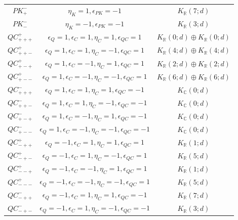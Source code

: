 \documentclass{tADP2e}
\theoremstyle{plain}
\theoremstyle{plain}
\theoremstyle{definition}
\begin{document}
\begin{appendices}
\begin{table}[tbp]
\begin{center}
\begin{tabular}{ccc}
$PK^-_+$ & %
$\eta_K=1,\epsilon_{PK}=-1$ & $K_{\mathbb{R}}(7;d)$ \\
$PK^-_-$ & %
$\eta_K=-1,\epsilon_{PK}=-1$ & $K_{\mathbb{R}}(3;d)$ \\
$QC^+_{+++}$ & $\epsilon_Q=1,\epsilon_C=1,\eta_C=1,\epsilon_{QC}=1$ & $K_{\mathbb{R}}(0;d)\oplus K_{\mathbb{R}}(0;d)$ \\
$QC^+_{++-}$ & $\epsilon_Q=1,\epsilon_C=1,\eta_C=-1,\epsilon_{QC}=1$ & $K_{\mathbb{R}}(4;d)\oplus K_{\mathbb{R}}(4;d)$ \\
$QC^+_{+-+}$ & $\epsilon_Q=1,\epsilon_C=-1,\eta_C=1,\epsilon_{QC}=1$ & $K_{\mathbb{R}}(2;d)\oplus K_{\mathbb{R}}(2;d)$ \\
$QC^+_{+--}$ & $\epsilon_Q=1,\epsilon_C=-1,\eta_C=-1,\epsilon_{QC}=1$ & $K_{\mathbb{R}}(6;d)\oplus K_{\mathbb{R}}(6;d)$ \\
$QC^-_{+++}$ & %
$\epsilon_Q=1,\epsilon_C=1,\eta_C=1,\epsilon_{QC}=-1$ & $K_{\mathbb{C}}(0;d)$ \\
$QC^-_{++-}$ & %
$\epsilon_Q=1,\epsilon_C=1,\eta_C=-1,\epsilon_{QC}=-1$ & $K_{\mathbb{C}}(0;d)$ \\
$QC^-_{+-+}$ & %
$\epsilon_Q=1,\epsilon_C=-1,\eta_C=1,\epsilon_{QC}=-1$ & $K_{\mathbb{C}}(0;d)$ \\
$QC^-_{+--}$ & %
$\epsilon_Q=1,\epsilon_C=-1,\eta_C=-1,\epsilon_{QC}=-1$ & $K_{\mathbb{C}}(0;d)$ \\
$QC^+_{-++}$ & %
$\epsilon_Q=-1,\epsilon_C=1,\eta_C=1,\epsilon_{QC}=1$ & $K_{\mathbb{R}}(1;d)$ \\
$QC^+_{-+-}$ & %
$\epsilon_Q=-1,\epsilon_C=1,\eta_C=-1,\epsilon_{QC}=1$ & $K_{\mathbb{R}}(5;d)$ \\
$QC^+_{--+}$ & %
$\epsilon_Q=-1,\epsilon_C=-1,\eta_C=1,\epsilon_{QC}=1$ & $K_{\mathbb{R}}(1;d)$ \\
$QC^+_{---}$ & %
$\epsilon_Q=-1,\epsilon_C=-1,\eta_C=-1,\epsilon_{QC}=1$ & $K_{\mathbb{R}}(5;d)$ \\
$QC^-_{-++}$ & %
$\epsilon_Q=-1,\epsilon_C=1,\eta_C=1,\epsilon_{QC}=-1$ & $K_{\mathbb{R}}(7;d)$ \\
$QC^-_{-+-}$ & %
$\epsilon_Q=-1,\epsilon_C=1,\eta_C=-1,\epsilon_{QC}=-1$ & $K_{\mathbb{R}}(3;d)$ \\

\end{tabular}
\end{center}
\end{table}
\end{appendices}
\end{document}
